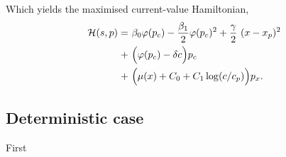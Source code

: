 \documentclass[../../main.tex]{subfiles}
\begin{document}
Which yields the maximised current-value Hamiltonian, \begin{equation}
    \begin{split}
        \mathcal{H}(s, p) = \ &\beta_0 \varphi(p_c) - \frac{\beta_1}{2} \varphi(p_c)^2 + \frac{\gamma}{2} \ (x - x_p)^2 \\
        + \ &\Big(\varphi(p_c) - \delta c\Big) p_c \\
        + \ &\Big(\mu(x) + C_0 + C_1 \log(c / c_p)\Big) p_x.
    \end{split}
\end{equation}

\subsection{Deterministic case}

First 
\end{document}
